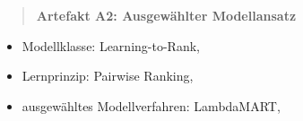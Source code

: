 \begin{quote} 
    \textbf{Artefakt A2: Ausgewählter Modellansatz} 
\end{quote} 
\begin{itemize} 
    \item Modellklasse: Learning-to-Rank, 
    \item Lernprinzip: Pairwise Ranking,
    \item ausgewähltes Modellverfahren: LambdaMART,  
\end{itemize} 





